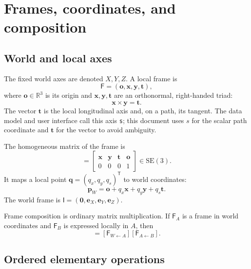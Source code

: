\documentclass[11pt,a4paper]{article}
\newcommand{\R}{\mathbb{R}}
\newcommand{\SE}{\mathrm{SE}(3)}
\newcommand{\Frame}{\mathsf{F}}
\newcommand{\identity}{\mathsf{I}}
\begin{document}
\section{Frames, coordinates, and composition}

\subsection{World and local axes}

The fixed world axes are denoted $X,Y,Z$.  A local frame is
\begin{equation}
  \Frame=(\mathbf{o},\mathbf{x},\mathbf{y},\mathbf{t}),
\end{equation}
where $\mathbf{o}\in\R^3$ is its origin and
$\mathbf{x},\mathbf{y},\mathbf{t}$ are an orthonormal, right-handed triad:
\begin{equation}
  \mathbf{x}\times\mathbf{y}=\mathbf{t}.
\end{equation}
The vector $\mathbf{t}$ is the local longitudinal axis and, on a path, its
tangent.  The data model and user interface call this axis \texttt{s}; this
document uses $s$ for the scalar path coordinate and $\mathbf{t}$ for the vector
to avoid ambiguity.

The homogeneous matrix of the frame is
\begin{equation}
  [\Frame]
  =
  \begin{bmatrix}
    \mathbf{x} & \mathbf{y} & \mathbf{t} & \mathbf{o}\\
    0&0&0&1
  \end{bmatrix}
  \in\SE.
  \label{eq:frame-matrix}
\end{equation}
It maps a local point $\mathbf{q}=(q_x,q_y,q_s)^\mathsf{T}$ to world
coordinates:
\begin{equation}
  \mathbf{p}_{W}
  =\mathbf{o}+q_x\mathbf{x}+q_y\mathbf{y}+q_s\mathbf{t}.
  \label{eq:local-to-world}
\end{equation}
The world frame is
$\identity=(\mathbf{0},\mathbf{e}_X,\mathbf{e}_Y,\mathbf{e}_Z)$.

Frame composition is ordinary matrix multiplication.  If $\Frame_A$ is a
frame in world coordinates and $\Frame_B$ is expressed locally in $A$, then
\begin{equation}
  [\Frame_{W\leftarrow B}]
  = [\Frame_{W\leftarrow A}][\Frame_{A\leftarrow B}].
  \label{eq:composition}
\end{equation}

\subsection{Ordered elementary operations}
\end{document}
